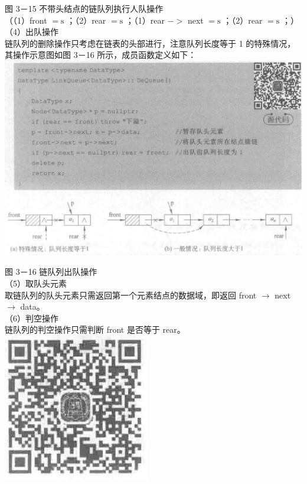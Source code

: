 \documentclass[10pt]{article}
\begin{document}
图 3－15 不带头结点的链队列执行人队操作\\
（（1）front $=\mathrm{s}$ ；（2）rear $=\mathrm{s}$ ；（1）rear $->$ next $=\mathrm{s}$ ；（2）rear $=\mathrm{s}$ ；）\\
（4）出队操作\\
链队列的删除操作只考虑在链表的头部进行，注意队列长度等于 1 的特殊情况，其操作示意图如图 3－16 所示，成员函数定义如下：\\
\includegraphics[max width=\textwidth, center]{2025_06_06_704745ea57b15b2333e5g-098(2)}

图 3－16 链队列出队操作\\
（5）取队头元素\\
取链队列的队头元素只需返回第一个元素结点的数据域，即返回 front $\rightarrow$ next $\rightarrow$ data。\\
（6）判空操作\\
链队列的判空操作只需判断 front 是否等于 rear。\\
\includegraphics[max width=\textwidth, center]{2025_06_06_704745ea57b15b2333e5g-098}
\end{document}
